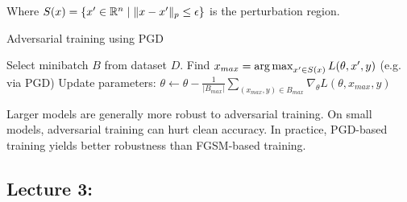 \documentclass[11pt]{article}
\begin{document}
Where $S(x) = \{x' \in \mathbb{R}^n \mid \|x - x'\|_p \leq \epsilon\}$ is the perturbation region. 

\begin{algorithm}
\caption{Adversarial training using PGD}
\begin{algorithmic}[1]
\State Select minibatch $B$ from dataset $D$.
	\State Find $x_{max} = \operatorname*{arg\,max}_{x' \in S(x)} L(\theta, x', y)$ (e.g. via PGD)
\EndFor
\State Update parameters: $\theta \gets \theta - \frac{1}{|B_{max}|}\sum_{(x_{max}, y) \in B_{max}} \nabla_{\theta} L(\theta, x_{max}, y)$
\end{algorithmic}
\end{algorithm}

Larger models are generally more robust to adversarial training. On small models, adversarial training can hurt clean accuracy. In practice, PGD-based training yields better robustness than FGSM-based training.

\newpage
\subsection{Lecture 3: }

\newpage
\printbibliography
\end{document}
